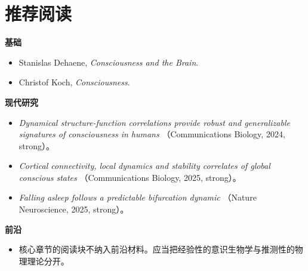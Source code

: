 \section{推荐阅读}

\begin{readingbox}
\textbf{基础}
\begin{itemize}[nosep]
  \item Stanislas Dehaene, \emph{Consciousness and the Brain}.
  \item Christof Koch, \emph{Consciousness}.
\end{itemize}
\textbf{现代研究}
\begin{itemize}[nosep]
  \item \emph{Dynamical structure-function correlations provide robust and
        generalizable signatures of consciousness in humans}
        （Communications Biology, 2024, strong）。
  \item \emph{Cortical connectivity, local dynamics and stability correlates of
        global conscious states} （Communications Biology, 2025, strong）。
  \item \emph{Falling asleep follows a predictable bifurcation dynamic}
        （Nature Neuroscience, 2025, strong）。
\end{itemize}
\textbf{前沿}
\begin{itemize}[nosep]
  \item 核心章节的阅读块不纳入前沿材料。应当把经验性的意识生物学与推测性的物理理论分开。
\end{itemize}
\end{readingbox}